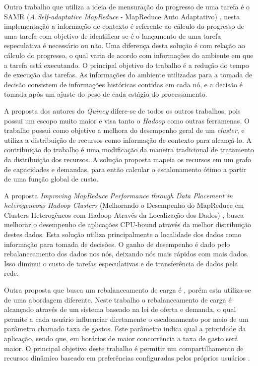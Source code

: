 Outro trabalho que utiliza a ideia de mensuração do progresso de uma tarefa é o SAMR (\textit{A Self-adaptative MapReduce} - MapReduce Auto Adaptativo) \cite{SAMR}, nesta implementação a informação de contexto é referente ao cálculo do progresso de uma tarefa com objetivo de identificar se é o lançamento de uma tarefa especulativa é necessário ou não. Uma diferença desta solução é com relação ao cálculo do progresso, o qual varia de acordo com informações do ambiente em que a tarefa está executando. O principal objetivo do trabalho é a redução do tempo de execução das tarefas. As informações do ambiente utilizadas para a tomada de decisão consistem de informações históricas contidas em cada nó, e a decisão é tomada após um ajuste do peso de cada estágio do processamento.


A proposta dos autores do \textit{Quincy} \cite{Quincy} difere-se de todos os outros trabalhos, pois possui um escopo muito maior e visa tanto o \textit{Hadoop} como outras ferramenas. O trabalho possui como objetivo a melhora do desempenho geral de um \textit{cluster}, e utiliza a distribuição de recursos como informação de contexto para alcançá-lo. A contribuição do trabalho é uma modificação da maneira tradicional de tratamento da distribuição dos recursos. A solução proposta mapeia os recursos em um grafo de capacidades e demandas, para então calcular o escalonamento ótimo a partir de uma função global de custo.

A proposta \textit{Improving MapReduce Performance through Data Placement in heterogeneous Hadoop Clusters} (Melhorando o Desempenho do MapReduce em Clusters Heterogêneos com Hadoop Através da Localização dos Dados) \cite{IMRPDPHHC}, busca melhorar o desempenho de aplicações CPU-bound através da melhor distribuição destes dados. Esta solução utiliza principalmente a localidade dos dados como informação para tomada de decisões. O ganho de desempenho é dado pelo rebalanceamento dos dados nos nós, deixando nós mais rápidos com mais dados. Isso diminui o custo de tarefas especulativas e de transferência de dados pela rede.

Outra proposta que busca um rebalanceamento de carga é \cite{Sandholm}, porém esta utiliza-se de uma abordagem diferente. Neste trabalho o rebalanceamento de carga é alcançado através de um sistema baseado na lei de oferta e demanda, o qual permite a cada usuário influenciar diretamente o escalonamento por meio de um parâmetro chamado taxa de gastos. Este parâmetro indica qual a prioridade da aplicação, sendo que, em horários de maior concorrência a taxa de gasto será maior. O principal objetivo deste trabalho é permitir um compartilhamento de recursos dinâmico baseado em preferências configuradas pelos próprios usuários .

